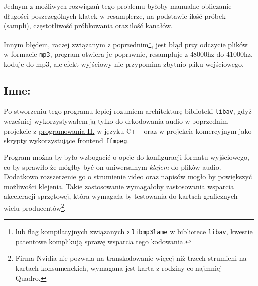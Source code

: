 \documentclass[a4paper,12pt]{article}
\begin{document}
Jednym z możliwych rozwiązań tego problemu byłoby manualne obliczanie długości
poszczególnych klatek w resamplerze, na podstawie ilość próbek (sampli),
częstotliwość próbkowania oraz ilość kanałów.

Innym błędem, raczej związanym z poprzednim\footnote{lub flag kompilacyjnych
związanych z \texttt{libmp3lame} w bibliotece \texttt{libav}, kwestie patentowe
komplikują sprawę wsparcia tego kodowania.}, jest błąd przy odczycie plików w
formacie \texttt{mp3}, program otwiera je poprawnie, resampluje z 48000hz do
41000hz, koduje do mp3, ale efekt wyjściowy nie przypomina zbytnio pliku
wejściowego.

\subsection{Inne:}

Po stworzeniu tego programu lepiej rozumiem architekturę biblioteki
\texttt{libav}, gdyż wcześniej wykorzystywałem ją tylko do dekodowania audio w
poprzednim projekcie z
\href{https://github.com/HakierGrzonzo/GrzesSFMLlib}{programowania II.} w języku
C++ oraz w projekcie komercyjnym jako skrypty wykorzystujące frontend
\texttt{ffmpeg}. 

Program można by było wzbogacić o opcje do konfiguracji formatu wyjściowego, co
by sprawiło że mógłby być on uniwersalnym \emph{klejem} do plików audio.
Dodatkowo rozszerzenie go o strumienie video oraz napisów mogło by powiększyć
możliwości klejenia. Takie zastosowanie wymagałoby zastosowania wsparcia
akceleracji sprzętowej, która wymagała by testowania do kartach graficznych
wielu producentów\footnote{Firma Nvidia nie pozwala na transkodowanie więcej niż
trzech strumieni na kartach konsumenckich, wymagana jest karta z rodziny
co najmniej Quadro.}. 
\end{document}
